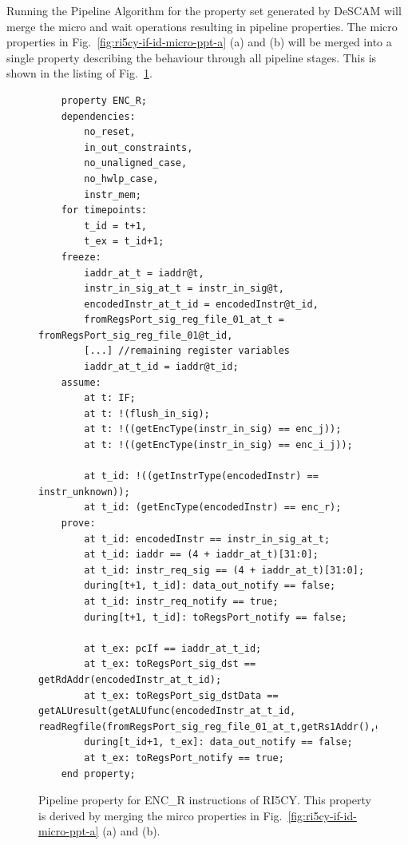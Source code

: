 Running the Pipeline Algorithm for the property set generated by DeSCAM will merge the micro and wait operations resulting in pipeline properties. The micro properties in Fig.~\ref{fig:ri5cy-if-id-micro-ppt-a} (a) and (b) will be merged into a single property describing the behaviour through all pipeline stages. This is shown in the listing of Fig.~\ref{fig:ri5cy-enc-r-ppt}.

\begin{figure}[htb!]
    \begin{lstlisting}
    property ENC_R;
    dependencies: 
        no_reset,
        in_out_constraints,
        no_unaligned_case,
        no_hwlp_case,
        instr_mem;
    for timepoints:
        t_id = t+1,
        t_ex = t_id+1;
    freeze:
        iaddr_at_t = iaddr@t,
        instr_in_sig_at_t = instr_in_sig@t,
        encodedInstr_at_t_id = encodedInstr@t_id,
        fromRegsPort_sig_reg_file_01_at_t = fromRegsPort_sig_reg_file_01@t_id,
        [...] //remaining register variables
        iaddr_at_t_id = iaddr@t_id;
    assume:
        at t: IF;
        at t: !(flush_in_sig);
        at t: !((getEncType(instr_in_sig) == enc_j));
        at t: !((getEncType(instr_in_sig) == enc_i_j));
        
        at t_id: !((getInstrType(encodedInstr) == instr_unknown));
        at t_id: (getEncType(encodedInstr) == enc_r);
    prove:
        at t_id: encodedInstr == instr_in_sig_at_t;
        at t_id: iaddr == (4 + iaddr_at_t)[31:0];
        at t_id: instr_req_sig == (4 + iaddr_at_t)[31:0];
        during[t+1, t_id]: data_out_notify == false;
        at t_id: instr_req_notify == true;
        during[t+1, t_id]: toRegsPort_notify == false;
        
        at t_ex: pcIf == iaddr_at_t_id;
        at t_ex: toRegsPort_sig_dst == getRdAddr(encodedInstr_at_t_id);
        at t_ex: toRegsPort_sig_dstData == getALUresult(getALUfunc(encodedInstr_at_t_id, readRegfile(fromRegsPort_sig_reg_file_01_at_t,getRs1Addr(),getRs2Addr()));
        during[t_id+1, t_ex]: data_out_notify == false;
        at t_ex: toRegsPort_notify == true;
    end property;\end{lstlisting}
    \caption{Pipeline property for ENC\_R instructions of RI5CY. This property is derived by merging the mirco properties in Fig.~\ref{fig:ri5cy-if-id-micro-ppt-a} (a) and (b).}
    \label{fig:ri5cy-enc-r-ppt}
\end{figure}

